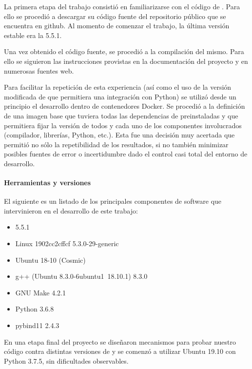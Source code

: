 La primera etapa del trabajo consistió en familiarizarse con el código de
\omnetpp{}. Para ello se procedió a descargar su código fuente del repositorio
público que se encuentra en github. Al momento de comenzar el trabajo, la
última versión estable era la 5.5.1.

Una vez obtenido el código fuente, se procedió a la compilación del mismo. Para
ello se siguieron las instrucciones provistas en la documentación del proyecto
y en numerosas fuentes web.

Para facilitar la repetición de esta experiencia (así como el uso de la versión
modificada de \omnetpp{} que permitiera una integración con Python) se utilizó
desde un principio el desarrollo dentro de contenedores Docker. Se procedió a
la definición de una imagen base que tuviera todas las dependencias de \omnetpp{}
preinstaladas y que permitiera fijar la versión de todos y cada uno de los
componentes involucrados (compilador, librerías, Python, etc.). Esta fue una
decisión muy acertada que permitió no sólo la repetibilidad de los resultados,
si no también minimizar posibles fuentes de error o incertidumbre dado el
control casi total del entorno de desarrollo.

\paragraph{Herramientas y versiones}

El siguiente es un listado de los principales componentes de software que
intervinieron en el desarrollo de este trabajo:

\begin{itemize}
    \item \omnetpp{} 5.5.1

    \item Linux 1902cc2cffcf 5.3.0-29-generic

    \item Ubuntu 18-10 (Cosmic)

    \item g++ (Ubuntu 8.3.0-6ubuntu1~18.10.1) 8.3.0

    \item GNU Make 4.2.1

    \item Python 3.6.8

    \item pybind11 2.4.3
\end{itemize}

En una etapa final del proyecto se diseñaron mecanismos para probar nuestro
código contra distintas versiones de \omnetpp{} y se comenzó a utilizar Ubuntu
19.10 con Python 3.7.5, sin dificultades observables.

